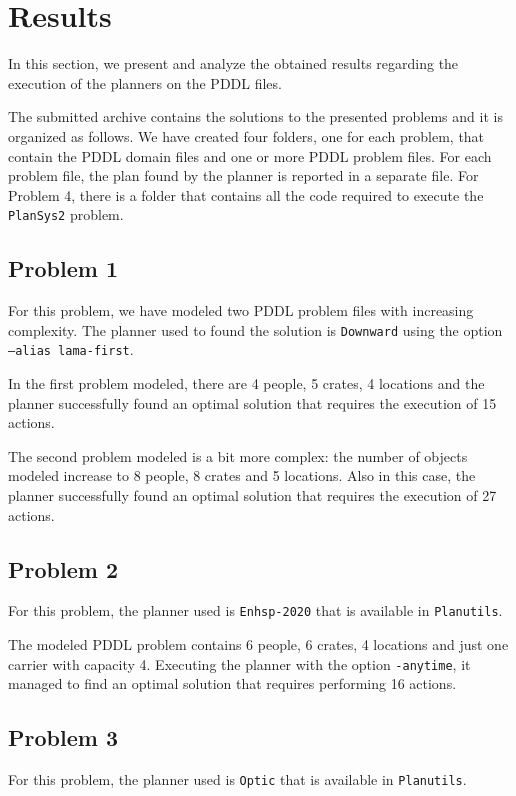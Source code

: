 \section{Results}
\label{sec4}
In this section, we present and analyze the obtained results regarding the execution of the planners on 
the PDDL files.

The submitted archive contains the solutions to the presented problems and it is organized as follows.
We have created four folders, one for each problem, that contain the PDDL domain files and one or more 
PDDL problem files. For each problem file, the plan found by the planner is reported in a separate file.
For Problem 4, there is a folder that contains all the code required to execute the \texttt{PlanSys2} 
problem.


\subsection{Problem 1}
For this problem, we have modeled two PDDL problem files with increasing complexity.
The planner used to found the solution is \texttt{Downward} using the option \texttt{--alias lama-first}.

In the first problem modeled, there are 4 people, 5 crates, 4 locations and the planner successfully
found an optimal solution that requires the execution of 15 actions.

The second problem modeled is a bit more complex: the number of objects modeled increase to 8 people, 
8 crates and 5 locations. Also in this case, the planner successfully
found an optimal solution that requires the execution of 27 actions.


\subsection{Problem 2}
For this problem, the planner used is \texttt{Enhsp-2020} that is available in \texttt{Planutils}.

The modeled PDDL problem contains 6 people, 6 crates, 4 locations and just one carrier with capacity 4.
Executing the planner with the option \texttt{-anytime}, it managed to find an optimal solution that 
requires performing 16 actions.

\subsection{Problem 3}
For this problem, the planner used is \texttt{Optic} that is available in \texttt{Planutils}.


